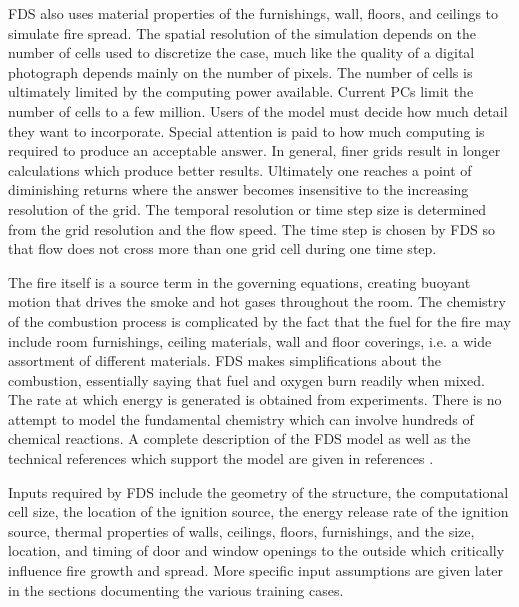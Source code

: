 \documentclass[11pt]{book}
\begin{document}
FDS also uses material properties of the furnishings, wall, floors, and ceilings to simulate fire spread.  The spatial resolution of the simulation depends on the number of cells used to discretize the case, much like the quality of a digital photograph depends mainly on the number of pixels. The number of cells is ultimately limited by the computing power available. Current PCs limit the number of cells to a few million. Users of the model must decide how much detail they want to incorporate. Special attention is paid to how much computing is required to produce an acceptable answer. In general, finer grids result in longer calculations which produce better results. Ultimately one reaches a point of diminishing returns where the answer becomes insensitive to the increasing resolution of the grid.  The temporal resolution or time step size is determined from the grid resolution and the flow speed. The time step is chosen by FDS so that flow does not cross more than one grid cell during one time step.

The fire itself is a source term in the governing equations, creating buoyant motion that drives the smoke and hot gases throughout the room. The chemistry of the combustion process is complicated by the fact that the fuel for the fire may include room furnishings, ceiling materials, wall and floor coverings, i.e. a wide assortment of different materials. FDS makes simplifications about the combustion, essentially saying that fuel and oxygen burn readily when mixed. The rate at which energy is generated is obtained from experiments. There is no attempt to model the fundamental chemistry which can involve hundreds of chemical reactions.  A complete description of the FDS model as well as the technical references which support the model are given in references \cite{FDS_Users_Guide_5,FDS_Tech_Guide_5}.

Inputs required by FDS include the geometry of the structure, the computational cell size, the location of the ignition source, the energy release rate of the ignition source, thermal properties of walls, ceilings, floors, furnishings, and the size, location, and timing of door and window openings to the outside which critically influence fire growth and spread.  More specific input assumptions are given later in the sections documenting the various training cases.
\end{document}
